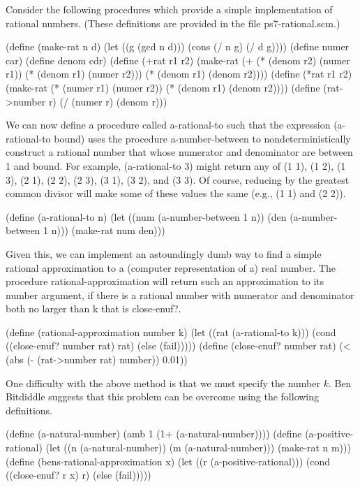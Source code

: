 Consider the following procedures which provide a simple implementation of
rational numbers. (These definitions are provided in the file {\cf ps7-rational.scm}.)

\beginlisp
(define (make-rat n d)
  (let ((g (gcd n d)))
    (cons (/ n g) (/ d g))))
\null
(define numer car)
\null
(define denom cdr)
\null
(define (+rat r1 r2)
  (make-rat (+ (* (denom r2) (numer r1))
               (* (denom r1) (numer r2)))
            (* (denom r1) (denom r2))))
\null
(define (*rat r1 r2)
  (make-rat (* (numer r1) (numer r2))
            (* (denom r1) (denom r2))))
\null
(define (rat->number r)
  (/ (numer r) (denom r)))
\endlisp

We can now define a procedure called {\cf a-rational-to} such that
the expression {\cf (a-rational-to bound)} uses the procedure
{\cf a-number-between} to nondeterministically construct a rational number that whose
numerator and denominator are between 1 and {\cf bound}.  For example,
{\cf (a-rational-to 3)} might return any of {\cf (1 1)}, {\cf (1 2)},
{\cf (1 3)}, {\cf (2 1)}, {\cf (2 2)}, {\cf (2 3)}, {\cf (3 1)}, {\cf (3 2)},
and {\cf (3 3)}.  Of course, reducing by the greatest common divisor will make
some of these values the same (e.g., {\cf (1 1)} and {\cf (2 2)}).

\beginlisp
(define (a-rational-to n)
  (let ((num (a-number-between 1 n))
        (den (a-number-between 1 n)))
    (make-rat num den)))
\endlisp

Given this, we can implement an astoundingly dumb way to find a simple rational
approximation to a (computer representation of a) real number.  The procedure
{\cf rational-approximation} will return such an approximation to its {\cf
number} argument, if there is a rational number with numerator and denominator
both no larger than {\cf k} that is {\cf close-enuf?}.

\beginlisp
(define (rational-approximation number k)
  (let ((rat (a-rational-to k)))
    (cond ((close-enuf? number rat) rat)
          (else (fail)))))
\null
(define (close-enuf? number rat)
  (< (abs (- (rat->number rat) number)) 0.01))
\endlisp

One difficulty with the above method is that we must specify the number $k$.
Ben Bitdiddle suggests that this problem can be overcome using the
following definitions.

\beginlisp
(define (a-natural-number)
  (amb 1
       (1+ (a-natural-number))))
\null
(define (a-positive-rational)
  (let ((n (a-natural-number))
        (m (a-natural-number)))
    (make-rat n m)))
\null
(define (bens-rational-approximation x)
  (let ((r (a-positive-rational)))
    (cond ((close-enuf? r x) r)
          (else (fail)))))
\endlisp

